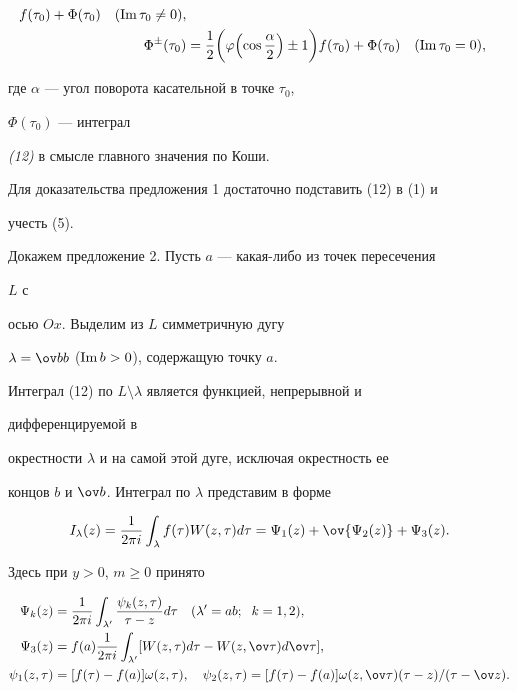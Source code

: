 \begin{thm}
\begin{itemize}
\begin{align}
f(\tau_0)+\Phi(\tau_0)\quad (\im \tau_0\ne 0),\\ 


\Phi^\pm(\tau_0)&=\frac{1}{2}\biggl(\varphi\Bigl(\cos 


\frac{\alpha}{2}\Bigr)\pm 1\biggr)f(\tau_0)+\Phi(\tau_0)\quad 


(\im\tau_0=0), 


\end{align} 


где $\alpha$ --- угол поворота касательной в точке $\tau_0$, 


$\Phi(\tau_0)$ --- интеграл 


{\em (12)} в смысле главного значения по Коши. 


\end{itemize} 


\end{thm} 


 


Для доказательства предложения 1 достаточно подставить (12) в (1) и 


учесть (5). 


 


Докажем предложение 2. Пусть $a$ --- какая-либо из точек пересечения 


$L$ с 


осью $Ox$. Выделим из $L$ симметричную дугу 


$\lambda=\ov bb$ ($\text{Im\,} b>0$), содержащую точку $a$. 


Интеграл (12) по $L\setminus\lambda$ является функцией, непрерывной и 


дифференцируемой в 


окрестности $\lambda$ и на самой этой дуге, исключая окрестность ее 


концов $b$ и $\ov b$. Интеграл по $\lambda$ представим в форме


$$ 


I_\lambda(z)=\frac{1}{2\pi i}\int_\lambda f(\tau) 


W(z,\tau)d\tau=\Psi_1(z)+\ov{\Psi_2(z)}+\Psi_3(z). 


$$ 


Здесь при $y>0$, $m\ge 0$ принято 


\begin{align*} 


\Psi_k(z)&=\frac{1}{2\pi i}\int_{\lambda'} 


\frac{\psi_k(z,\tau)}{\tau-z}d\tau\quad 


(\lambda'=ab; \ \;k=1,2),\\ 


%


\Psi_3(z)&=f(a)\frac{1}{2\pi i}\int_{\lambda'} 


[W(z,\tau)d\tau-W(z,\ov\tau)d\ov\tau],\\ 


\psi_1(z,\tau)&=[f(\tau)-f(a)]\omega(z,\tau),\quad


\psi_2(z,\tau)=[f(\tau)-f(a)]\omega(z,\ov\tau)(\tau-z)/(\tau-\ov z). 


\end{align*} 


